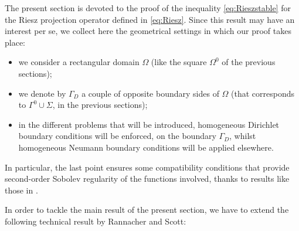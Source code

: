 \documentclass[final,hidelinks]{siamart1116Arxiv}
\numberwithin{theorem}{section}
\begin{document}
The present section is devoted to the proof of the inequality \cref{eq:Rieszstable} for the Riesz projection operator defined in \cref{eq:Riesz}.
Since this result may have an interest per se, we collect here the geometrical settings in which our proof takes place:
\begin{itemize}
 \item we consider a rectangular domain $\Omega$ (like the square $\Omega^0$ of the previous sections);
 \item we denote by $\Gamma_D$ a couple of opposite boundary sides of $\Omega$ (that corresponds to $\Gamma^0\cup\Sigma$, in the previous sections);
 \item in the different problems that will be introduced, homogeneous Dirichlet boundary conditions will be enforced, on the boundary $\Gamma_D$, whilst homogeneous Neumann boundary conditions will be applied elsewhere.
\end{itemize}
In particular, the last point ensures some compatibility conditions that provide second-order Sobolev regularity of the functions involved, thanks to results like those in \cite{Lorenzi}.

In order to tackle the main result of the present section, we have to extend the following technical result by Rannacher and Scott:
\end{document}
